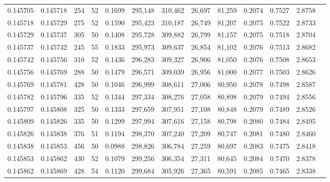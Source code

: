 \begin{tabular}{rrrrrrrrrrrrr}
0.145705 & 0.145718 &   254 &  52 &                                     0.1699 & 295,148 & 310,462 &  26,697 &  81,259 & 0.2074 & 0.7527 & 2.8758 \\
0.145718 & 0.145729 &   275 &  52 &                                     0.1590 & 295,423 & 310,187 &  26,749 &  81,207 & 0.2075 & 0.7522 & 2.8733 \\
0.145729 & 0.145737 &   305 &  50 &                                     0.1408 & 295,728 & 309,882 &  26,799 &  81,157 & 0.2075 & 0.7518 & 2.8704 \\
0.145737 & 0.145742 &   245 &  55 &                                     0.1833 & 295,973 & 309,637 &  26,854 &  81,102 & 0.2076 & 0.7513 & 2.8682 \\
0.145742 & 0.145756 &   310 &  52 &                                     0.1436 & 296,283 & 309,327 &  26,906 &  81,050 & 0.2076 & 0.7508 & 2.8653 \\
0.145756 & 0.145769 &   288 &  50 &                                     0.1479 & 296,571 & 309,039 &  26,956 &  81,000 & 0.2077 & 0.7503 & 2.8626 \\
0.145769 & 0.145781 &   428 &  50 &                                     0.1046 & 296,999 & 308,611 &  27,006 &  80,950 & 0.2078 & 0.7498 & 2.8587 \\
0.145782 & 0.145796 &   335 &  52 &                                     0.1344 & 297,334 & 308,276 &  27,058 &  80,898 & 0.2079 & 0.7494 & 2.8556 \\
0.145797 & 0.145808 &   325 &  50 &                                     0.1333 & 297,659 & 307,951 &  27,108 &  80,848 & 0.2079 & 0.7489 & 2.8526 \\
0.145809 & 0.145826 &   335 &  50 &                                     0.1299 & 297,994 & 307,616 &  27,158 &  80,798 & 0.2080 & 0.7484 & 2.8495 \\
0.145826 & 0.145838 &   376 &  51 &                                     0.1194 & 298,370 & 307,240 &  27,209 &  80,747 & 0.2081 & 0.7480 & 2.8460 \\
0.145838 & 0.145853 &   456 &  50 &                                     0.0988 & 298,826 & 306,784 &  27,259 &  80,697 & 0.2083 & 0.7475 & 2.8418 \\
0.145853 & 0.145862 &   430 &  52 &                                     0.1079 & 299,256 & 306,354 &  27,311 &  80,645 & 0.2084 & 0.7470 & 2.8378 \\
0.145862 & 0.145869 &   428 &  54 &                                     0.1120 & 299,684 & 305,926 &  27,365 &  80,591 & 0.2085 & 0.7465 & 2.8338 \\

\end{tabular}
